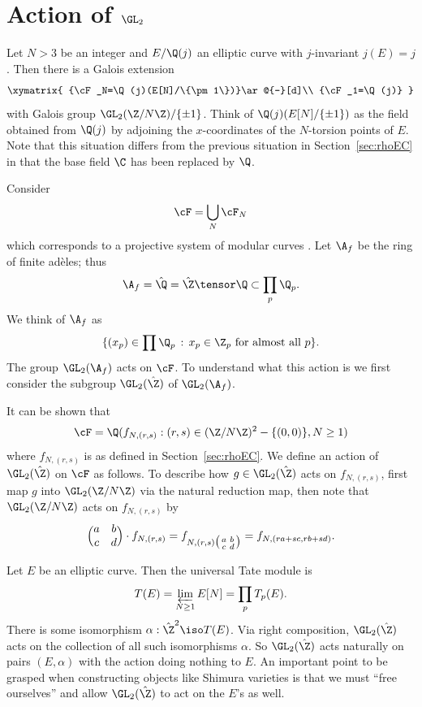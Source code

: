 \documentclass{report}
\begin{document}

\section{Action of $\GL_2$}

Let $N>3$ be an integer and $E/\Q(j)$ an elliptic curve
with $j$-invariant $j(E)=j$. Then there is a Galois extension
$$\xymatrix{
{\cF_N=\Q(j)(E[N]/\{\pm 1\})}\ar@{-}[d]\\
{\cF_1=\Q(j)}
}
$$
with Galois group $\GL_2(\Z/N\Z)/\{\pm 1\}$.  Think of
$\Q(j)(E[N]/\{\pm 1\})$ as the field obtained from $\Q(j)$ by
adjoining the $x$-coordinates of the $N$-torsion points of $E$. Note
that this situation differs from the previous situation in
Section~\ref{sec:rhoEC} in that the base field $\C$ has been replaced
by $\Q$.

Consider $$\cF=\bigcup_{N}\cF_N$$
which corresponds to a projective system of modular curves
.
Let $\A_f$ be the ring of finite ad\`{e}les; thus
$$\A_f=\hat{\Q}=\hat{\Z}\tensor\Q\subset\prod_{p}\Q_p.$$
We think of $\A_f$ as
$$\{(x_p)\in \prod \Q_p \, :\, x_p\in\Z_p \text{ for almost all $p$}\}.$$
The group $\GL_2(\A_f)$ acts on $\cF$.
To understand what this action is we first consider the subgroup
$\GL_2(\hat{\Z})$
of $\GL_2(\A_f)$.

It can be shown that
$$\cF=\Q(f_{N,(r,s)} : (r,s)\in(\Z/N\Z)^2-\{(0,0)\}, N\geq{}1)$$
where $f_{N,(r,s)}$ is as defined
in Section~\ref{sec:rhoEC}.
We define an action of $\GL_2(\hat{\Z})$ on $\cF$ as follows.
To describe how $g\in\GL_2(\hat{\Z})$ acts on
$f_{N,(r,s)}$, first map $g$ into $\GL_2(\Z/N\Z)$ via the natural
reduction map, then note that $\GL_2(\Z/N\Z)$ acts on $f_{N,(r,s)}$ by
$$\Bigl(\begin{matrix}a&b\\c&d\end{matrix}\Bigr)\cdot{}f_{N,(r,s)}
  =f_{N,(r,s)\bigl(\begin{smallmatrix}a&b\\c&d\end{smallmatrix}\bigr)}
  =f_{N,(ra+sc,rb+sd)}.$$

Let $E$ be an elliptic curve. Then the universal Tate module is
$$T(E)=\varprojlim_{N\geq 1} E[N]=\prod_{p}T_p(E).$$
There is some isomorphism $\alpha:\hat{\Z}^2\iso T(E)$.
Via right composition, $\GL_2(\hat{\Z})$ acts on the collection of
all such isomorphisms $\alpha$. So $\GL_2(\hat{\Z})$ acts naturally
on pairs $(E,\alpha)$ with the action doing nothing to $E$. An
important point to be grasped when constructing objects like
Shimura varieties is that we must
``free ourselves'' and allow  $\GL_2(\hat{\Z})$ to act on
the $E$'s as well.
\end{document}
